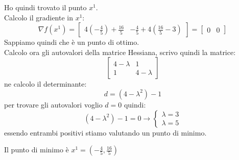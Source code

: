 \documentclass[a4paper,12pt, oneside]{book}
\begin{document}
Ho quindi trovato il punto $x^1$.\\
Calcolo il gradiente in $x^1$:
\[\nabla f(x^1)=[
  \begin{matrix}
    4(-\frac{4}{5})+\frac{16}{5} & -\frac{4}{5}+4(\frac{16}{5}-3)
  \end{matrix}]=[
  \begin{matrix}
    0 & 0
  \end{matrix}]
\]
Sappiamo quindi che è un punto di ottimo.\\
Calcolo ora gli autovalori della matrice Hessiana, scrivo quindi la
matrice:
\[\left[
    \begin{matrix}
      4-\lambda & 1\\
      1 & 4-\lambda
    \end{matrix}
  \right]
\]
ne calcolo il determinante:
\[d=(4-\lambda^2)-1\]
per trovare gli autovalori voglio $d=0$ quindi:
\[(4-\lambda^2)-1=0\to
  \begin{cases}
    \lambda = 3\\
    \lambda = 5
  \end{cases}
\]
essendo entrambi positivi stiamo valutando un punto di minimo.\\
\begin{shaded}
  Il punto di minimo è $x^1=\left(-\frac{4}{5}, \frac{16}{5}\right)$
\end{shaded}
\end{document}
